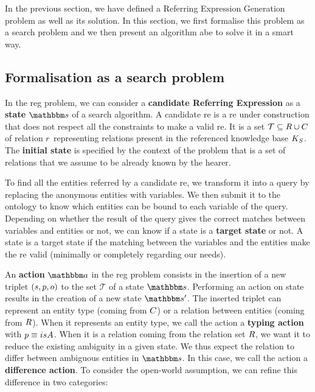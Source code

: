 In the previous section, we have defined a Referring Expression Generation problem as well as its solution. In this section, we first formalise this problem as a search problem and we then present an algorithm abe to solve it in a smart way.

\subsection{Formalisation as a search problem}

In the \acrshort{reg} problem, we can consider a \textbf{candidate Referring Expression} as a \textbf{state} $\state$ of a search algorithm. A candidate \acrshort{re} is a \acrshort{re} under construction that does not respect all the constraints to make a valid \acrshort{re}. It is a set $\mathcal{T} \subseteq R \cup C$ of relation $r$ representing relations present in the referenced knowledge base $K_S$. The \textbf{initial state} is specified by the context of the problem that is a set of relations that we assume to be already known by the hearer.

To find all the entities referred by a candidate \acrshort{re}, we transform it into a \sparql{} query by replacing the anonymous entities with variables. We then submit it to the ontology to know which entities can be bound to each variable of the query. Depending on whether the result of the query gives the correct matches between variables and entities or not, we can know if a state is a \textbf{target state} or not. A state is a target state if the matching between the variables and the entities make the \acrshort{re} valid (minimally or completely regarding our needs).

An \textbf{action} $\action$ in the \acrshort{reg} problem consists in the insertion of a new triplet $(s, p, o)$ to the set $\mathcal{T}$ of a state $\state$. Performing an action on state results in the creation of a new state $\state'$. The inserted triplet can represent an entity type (coming from $C$) or a relation between entities (coming from $R$). When it represents an entity type, we call the action a \textbf{typing action} with $p \equiv isA$. When it is a relation coming from the relation set $R$, we want it to reduce the existing ambiguity in a given state. We thus expect the relation to differ between ambiguous entities in $\state$. In this case, we call the action a \textbf{difference action}. To consider the open-world assumption, we can refine this difference in two categories:

